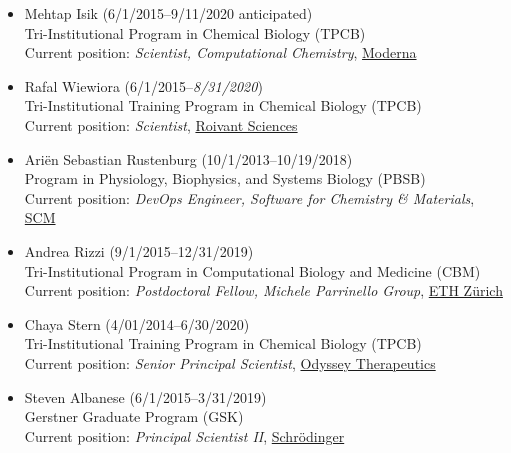 \documentclass[10pt]{article}
\begin{document}
\begin{itemize}
  \item Mehtap Isik (6/1/2015--9/11/2020 anticipated)\\
  Tri-Institutional Program in Chemical Biology (TPCB)\\
  Current position: \emph{Scientist, Computational Chemistry}, \href{https://www.modernatx.com/}{Moderna}
  
  \item Rafal Wiewiora (6/1/2015--\emph{8/31/2020})\\
  Tri-Institutional Training Program in Chemical Biology (TPCB)\\
  Current position: \emph{Scientist}, \href{https://roivant.com}{Roivant Sciences}
  
  \item Ari\"{e}n Sebastian Rustenburg (10/1/2013--10/19/2018)\\
  Program in Physiology, Biophysics, and Systems Biology (PBSB)\\
  Current position: \emph{DevOps Engineer, Software for Chemistry \& Materials}, \href{https://www.scm.com/}{SCM}

  \item Andrea Rizzi (9/1/2015--12/31/2019)\\
  Tri-Institutional Program in Computational Biology and Medicine (CBM)\\
  Current position: \emph{Postdoctoral Fellow, Michele Parrinello Group}, \href{https://parrinello.ethz.ch/}{ETH Z\"urich}

  \item Chaya Stern (4/01/2014--6/30/2020)\\
  Tri-Institutional Training Program in Chemical Biology (TPCB)\\
  Current position: \emph{Senior Principal Scientist},  \href{https://odysseytx.com/}{Odyssey Therapeutics}
 
  \item Steven Albanese (6/1/2015--3/31/2019)\\
  Gerstner Graduate Program (GSK)\\
  Current position: \emph{Principal Scientist II},  \href{http://www.schrodinger.com}{{Schr\"{o}dinger}}
  

\end{itemize}
\end{document}
